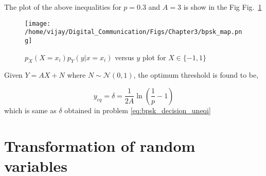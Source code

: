 \documentclass[journal,10pt,twocolumn]{IEEEtran}
\newcounter{Chapcounter}
\numberwithin{equation}{subsection}
\numberwithin{figure}{subsection}
\renewcommand\thesection{\theChapcounter.\arabic{section}}
\newcommand\figref{Fig.~\ref}
\providecommand{\gauss}[2]{\mathcal{N}\ensuremath{\left(#1,#2\right)}}
\renewcommand\thesection{\arabic{section}}
\renewcommand\thesubsection{\thesection.\arabic{subsection}}
\begin{document}
\begin{enumerate}[label=\thesubsection.\arabic*,ref=\thesubsection.\arabic{figure}]
The plot of the above inequalities for $p = 0.3$ and $A = 3$ is show in the Fig \figref{fig:bpsk_map_density} 
\begin{figure}[!ht]
\centering
\texttt{[image: /home/vijay/Digital\_Communication/Figs/Chapter3/bpsk\_map.png]}
\caption{$p_X(X=x_i)p_Y(y|x=x_i)$ versus $y$ plot for $X \in \{-1,1\}$}
\label{fig:bpsk_map_density}
\end{figure}

Given $Y=AX+N$ where $N \sim \gauss{0}{1}$, the optimum threshold is found to be,

\begin{equation}
	y_{eq} = \delta = \frac{1}{2A}\ln\left(\frac{1}{p}-1\right)
\end{equation}
which is same as $\delta$ obtained in problem \ref{eq:bpsk_decision_uneqi}

\end{enumerate}

\section{Transformation of random variables}	
\end{document}
